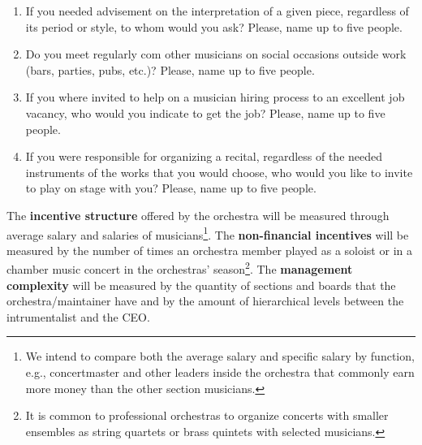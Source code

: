 \documentclass[a4paper, 12pt, openright, oneside, german, french, brazil, english]{abntex2}
\begin{document}
        \begin{enumerate}
        \item If you needed advisement on the interpretation of a given piece, regardless of its period or style, to whom would you ask? Please, name up to five people.
        \item Do you meet regularly com other musicians on social occasions outside work (bars, parties, pubs, etc.)? Please, name up to five people.
        \item If you where invited to help on a musician hiring process to an excellent job vacancy, who would you indicate to get the job?  Please, name up to five people.
        \item If you were responsible for organizing a recital, regardless of the needed instruments of the works that you would choose, who would you like to invite to play on stage with you?  Please, name up to five people.
        \end{enumerate}
	
	
	The \textbf{incentive structure} offered by the orchestra will be measured through average salary and salaries of musicians\footnote{We intend to compare both the average salary and specific salary by function, e.g., concertmaster and other leaders inside the orchestra that commonly earn more money than the other section musicians.}. The \textbf{non-financial incentives} will be measured by the number of times an orchestra member played as a soloist or in a chamber music concert in the orchestras' season\footnote{It is common to professional orchestras to organize concerts with smaller ensembles as string quartets or brass quintets with selected musicians.}. The \textbf{management complexity} will be measured by the quantity of sections and boards that the orchestra/maintainer have and by the amount of hierarchical levels between the intrumentalist and the CEO.
	
\end{document}
